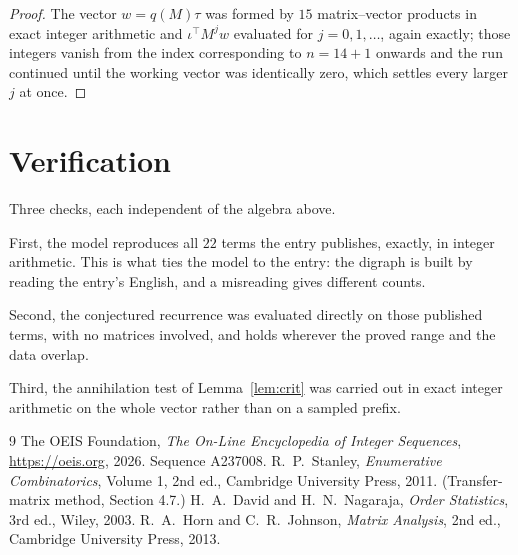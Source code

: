 \documentclass[11pt,a4paper]{article}
\theoremstyle{plain}
\theoremstyle{definition}
\begin{document}
\begin{proof}
The vector $w=q(M)\tau$ was formed by $15$ matrix--vector products in exact integer
arithmetic and $\iota^{\!\top}M^{j}w$ evaluated for $j=0,1,\dots$, again exactly; those
integers vanish from the index corresponding to $n=14+1$ onwards and the run continued
until the working vector was identically zero, which settles every larger $j$ at once.
\end{proof}

\section{Verification}

Three checks, each independent of the algebra above.

First, the model reproduces all $22$ terms the entry publishes, exactly, in integer
arithmetic. This is what ties the model to the entry: the digraph is built by reading the
entry's English, and a misreading gives different counts.

Second, the conjectured recurrence was evaluated directly on those published terms, with no
matrices involved, and holds wherever the proved range and the data overlap.

Third, the annihilation test of Lemma~\ref{lem:crit} was carried out in exact integer
arithmetic on the whole vector rather than on a sampled prefix.

\begin{thebibliography}{9}
 The OEIS Foundation, \emph{The On-Line Encyclopedia of Integer
Sequences}, \url{https://oeis.org}, 2026. Sequence A237008.
 R.~P.~Stanley, \emph{Enumerative Combinatorics}, Volume 1, 2nd ed.,
Cambridge University Press, 2011. (Transfer-matrix method, Section 4.7.)
 H.~A.~David and H.~N.~Nagaraja, \emph{Order Statistics}, 3rd ed., Wiley,
2003.
 R.~A.~Horn and C.~R.~Johnson, \emph{Matrix Analysis}, 2nd ed., Cambridge
University Press, 2013.
\end{thebibliography}
\end{document}
